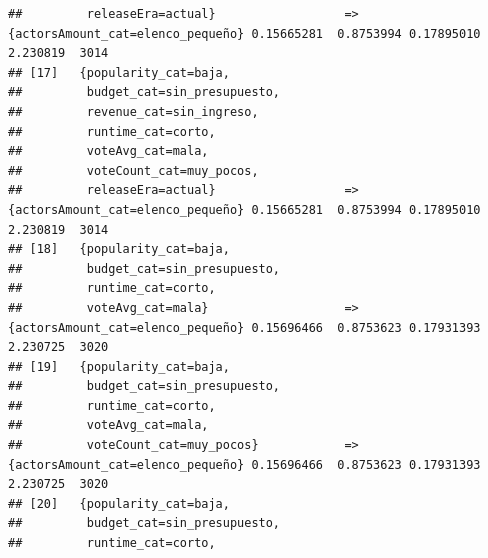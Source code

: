 \documentclass[
]{article}
\begin{document}
\begin{verbatim}
##         releaseEra=actual}                  => {actorsAmount_cat=elenco_pequeño} 0.15665281  0.8753994 0.17895010 2.230819  3014
## [17]   {popularity_cat=baja,                                                                                                    
##         budget_cat=sin_presupuesto,                                                                                             
##         revenue_cat=sin_ingreso,                                                                                                
##         runtime_cat=corto,                                                                                                      
##         voteAvg_cat=mala,                                                                                                       
##         voteCount_cat=muy_pocos,                                                                                                
##         releaseEra=actual}                  => {actorsAmount_cat=elenco_pequeño} 0.15665281  0.8753994 0.17895010 2.230819  3014
## [18]   {popularity_cat=baja,                                                                                                    
##         budget_cat=sin_presupuesto,                                                                                             
##         runtime_cat=corto,                                                                                                      
##         voteAvg_cat=mala}                   => {actorsAmount_cat=elenco_pequeño} 0.15696466  0.8753623 0.17931393 2.230725  3020
## [19]   {popularity_cat=baja,                                                                                                    
##         budget_cat=sin_presupuesto,                                                                                             
##         runtime_cat=corto,                                                                                                      
##         voteAvg_cat=mala,                                                                                                       
##         voteCount_cat=muy_pocos}            => {actorsAmount_cat=elenco_pequeño} 0.15696466  0.8753623 0.17931393 2.230725  3020
## [20]   {popularity_cat=baja,                                                                                                    
##         budget_cat=sin_presupuesto,                                                                                             
##         runtime_cat=corto,                                                                                                      

\end{verbatim}
\end{document}
